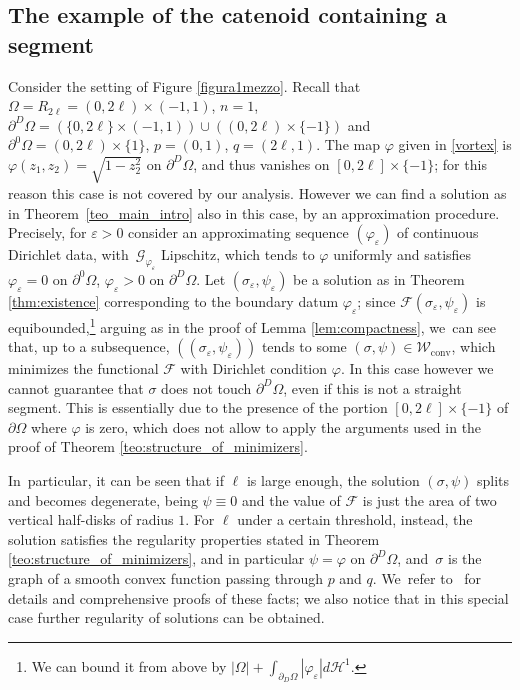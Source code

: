 \documentclass[JEP,XML,SOM,Unicode, NoFloatCountersInSection,published]{cedram}
\let\eps\varepsilon
\let\Om\Omega
\newcommand\admclassconv{{\mathcal W_\mathrm{conv}}}
\theoremstyle{definition}
\begin{document}
\subsection{The example of the catenoid containing a segment}
\label{subsec:the_example_of_the_catenoid_containing_a_segment}
Consider the setting of
Figure \ref{figura1mezzo}. Recall that
$\Omega=R_{2\ell}=(0,2\ell)\times (-1,1)$,
$n=1$, $\partial^D\Om=(\{0,2\ell\}\times (-1,1))\cup ((0,2\ell)\times \{-1\})$ and $\partial^0\Om=(0,2\ell)\times \{1\}$, $p=(0,1)$, $q=(2\ell,1)$.
The map $\varphi$ given in \eqref{vortex} is $\varphi(z_1,z_2)=\sqrt{1-z_2^2}$ on $\partial^D
\Om$, and thus
vanishes on $[0,2\ell]\times \{-1\}$; for this reason this case is not covered by our analysis. However we can find a solution as in Theorem~\ref{teo_main_intro} also in this case, by an approximation procedure.
Precisely, for $\eps>0$ consider an approximating sequence $(\varphi_\eps)$ of continuous Dirichlet data, with~$\mathcal G_{\varphi_\eps}$ Lipschitz, which tends to $\varphi$ uniformly and satisfies $\varphi_\eps=0$ on $\partial^0\Om$, $\varphi_\eps>0$ on $\partial^D\Om$. Let $(\sigma_\eps,\psi_\eps)$ be a solution as in Theorem \ref{thm:existence} corresponding to the boundary datum $\varphi_\eps$; since $\mathcal F(\sigma_\eps,\psi_\eps)$ is equibounded,\footnote{We can bound it from above by $|\Om|+\int_{\partial_D\Om}|\varphi_\eps|d\mathcal H^1$.} arguing as in the proof of Lemma \ref{lem:compactness}, we~can see that, up to
a subsequence, $((\sigma_\eps,\psi_\eps))$ tends to some $(\sigma,\psi)\in \admclassconv$, which minimizes the functional $\mathcal F$ with Dirichlet condition $\varphi$.
In this case however we cannot guarantee that $\sigma$ does not touch $\partial^D\Om$, even if this is not a straight segment.
This is essentially due to the presence of the
portion $[0,2\ell]\times \{-1\}$ of $\partial \Om$
where $\varphi$ is zero, which does not allow to apply the arguments used in the proof of Theorem \ref{teo:structure_of_minimizers}.\enlargethispage{2pt}

In~particular, it can be seen that if $\ell$ is large enough,
the solution $(\sigma,\psi)$ splits and becomes degenerate,
being $\psi\equiv0$ and the value of $\mathcal F$ is
just the area of two vertical half-disks of radius $1$. For $\ell$ under a certain threshold, instead, the solution satisfies the regularity properties stated in Theorem \ref{teo:structure_of_minimizers}, and in particular $\psi=\varphi$ on $\partial^D\Omega$, and~$\sigma$ is the graph of a smooth convex function passing through $p$ and $q$. We~refer to~\cite{BES2} for details and comprehensive proofs of these facts;
we also notice that in this special case further regularity of solutions
can be obtained.
\end{document}
